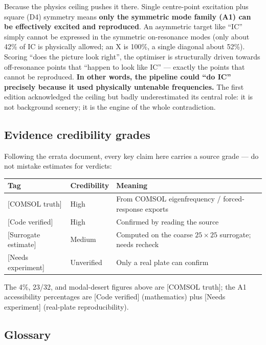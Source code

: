 \documentclass[11pt,a4paper]{article}
\begin{document}
Because the physics ceiling pushes it there. Single centre-point excitation plus square (D4) symmetry means \textbf{only the symmetric mode family (A1) can be effectively excited and reproduced}. An asymmetric target like ``IC'' simply cannot be expressed in the symmetric on-resonance modes (only about 42\% of IC is physically allowed; an X is 100\%, a single diagonal about 52\%). Scoring ``does the picture look right'', the optimiser is structurally driven towards off-resonance points that ``happen to look like IC'' --- exactly the points that cannot be reproduced. \textbf{In other words, the pipeline could ``do IC'' precisely because it used physically untenable frequencies.} The first edition acknowledged the ceiling but badly underestimated its central role: it is not background scenery; it is the engine of the whole contradiction.

\subsection{Evidence credibility grades}

Following the errata document, every key claim here carries a source grade --- do not mistake estimates for verdicts:

\begin{center}
\small
\begin{tabular}{@{}llp{}@{}}
\toprule
Tag & Credibility & Meaning \\
\midrule
{[COMSOL truth]} & High & From COMSOL eigenfrequency / forced-response exports \\
{[Code verified]} & High & Confirmed by reading the source \\
{[Surrogate estimate]} & Medium & Computed on the coarse $25\times 25$ surrogate; needs recheck \\
{[Needs experiment]} & Unverified & Only a real plate can confirm \\
\bottomrule
\end{tabular}
\end{center}

The 4\%, 23/32, and modal-desert figures above are [COMSOL truth]; the A1 accessibility percentages are [Code verified] (mathematics) plus [Needs experiment] (real-plate reproducibility).

\subsection*{Glossary}
\end{document}
